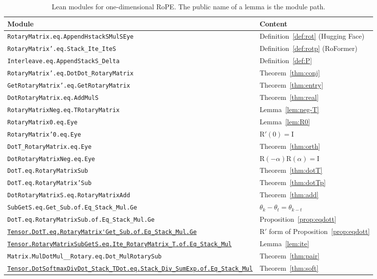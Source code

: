 \documentclass[11pt,a4paper]{article}
\newcommand{\lmod}[1]{\href{http://www.lemma.cn/lean/?module=#1}{\nolinkurl{#1}}}
\newcommand{\rot}{\mathrm{R}}
\newcommand{\eye}{\mathrm{I}}
\begin{document}
\begin{table}[t]
\centering
\caption{Lean modules for one-dimensional RoPE.
The public name of a lemma is the module path.}
\label{tab:mods}
\small
\begin{tabular}{p{}p{}}
\hline
Module & Content \\
\hline
\texttt{RotaryMatrix.eq.AppendHstackSMulSEye} & Definition~\ref{def:rot} (Hugging Face) \\
\texttt{RotaryMatrix'.eq.Stack\_Ite\_IteS} & Definition~\ref{def:rotp} (RoFormer) \\
\texttt{Interleave.eq.AppendStackS\_Delta} & Definition~\ref{def:P} \\
\texttt{RotaryMatrix'.eq.DotDot\_RotaryMatrix} & Theorem~\ref{thm:conj} \\
\texttt{GetRotaryMatrix'.eq.GetRotaryMatrix} & Theorem~\ref{thm:entry} \\
\texttt{DotRotaryMatrix.eq.AddMulS} & Theorem~\ref{thm:real} \\
\texttt{RotaryMatrixNeg.eq.TRotaryMatrix} & Lemma~\ref{lem:neg-T} \\
\texttt{RotaryMatrix0.eq.Eye} & Lemma~\ref{lem:R0} \\
\texttt{RotaryMatrix'0.eq.Eye} & \(\rot'(0)=\eye\) \\
\texttt{DotT\_RotaryMatrix.eq.Eye} & Theorem~\ref{thm:orth} \\
\texttt{DotRotaryMatrixNeg.eq.Eye} & \(\rot(-\alpha)\rot(\alpha)=\eye\) \\
\texttt{DotT.eq.RotaryMatrixSub} & Theorem~\ref{thm:dotT} \\
\texttt{DotT.eq.RotaryMatrix'Sub} & Theorem~\ref{thm:dotTp} \\
\texttt{DotRotaryMatrixS.eq.RotaryMatrixAdd} & Theorem~\ref{thm:add} \\
\texttt{SubGetS.eq.Get\_Sub.of.Eq\_Stack\_Mul.Ge} & \(\theta_k-\theta_t=\theta_{k-t}\) \\
\texttt{DotT.eq.RotaryMatrixSub.of.Eq\_Stack\_Mul.Ge} & Proposition~\ref{prop:eqdott} \\
{\footnotesize\lmod{Tensor.DotT.eq.RotaryMatrix'Get_Sub.of.Eq_Stack_Mul.Ge}} & \(\rot'\) form of Proposition~\ref{prop:eqdott} \\
{\footnotesize\lmod{Tensor.RotaryMatrixSubGetS.eq.Ite_RotaryMatrix_T.of.Eq_Stack_Mul}} & Lemma~\ref{lem:ite} \\
\texttt{Matrix.MulDotMul\_\_Rotary.eq.Dot\_MulRotarySub} & Theorem~\ref{thm:pair} \\
{\footnotesize\lmod{Tensor.DotSoftmaxDivDot_Stack_TDot.eq.Stack_Div_SumExp.of.Eq_Stack_Mul}} & Theorem~\ref{thm:soft} \\
\hline
\end{tabular}
\end{table}
\end{document}
